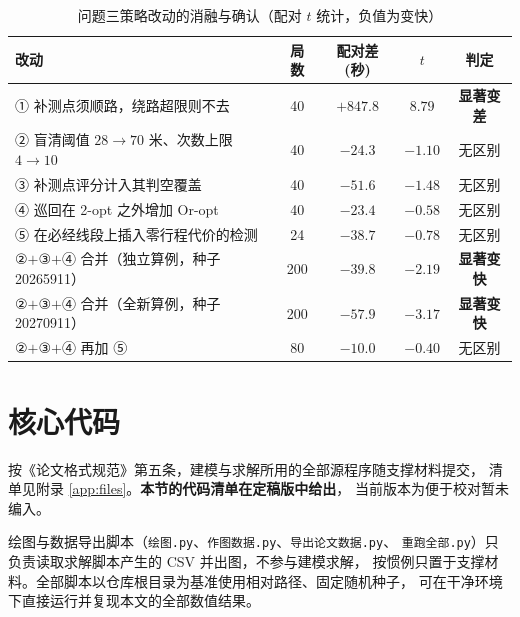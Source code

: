 \documentclass[withoutpreface, bwprint]{cumcmthesis}
\begin{document}
\begin{appendices}
\begin{table}[htbp]
  \centering
  \caption{问题三策略改动的消融与确认（配对 $t$ 统计，负值为变快）}
  \label{tab:p3opt}
  \begin{tabularx}{\textwidth}{Xcccc}
    \toprule
    改动 & 局数 & 配对差(秒) & $t$ & 判定 \\
    \midrule
    ① 补测点须顺路，绕路超限则不去 & 40 & $+847.8$ & $8.79$ & \textbf{显著变差} \\
    ② 盲清阈值 $28\to70$ 米、次数上限 $4\to10$ & 40 & $-24.3$ & $-1.10$ & 无区别 \\
    ③ 补测点评分计入其判空覆盖 & 40 & $-51.6$ & $-1.48$ & 无区别 \\
    ④ 巡回在 2-opt 之外增加 Or-opt & 40 & $-23.4$ & $-0.58$ & 无区别 \\
    ⑤ 在必经线段上插入零行程代价的检测 & 24 & $-38.7$ & $-0.78$ & 无区别 \\
    \midrule
    ②$+$③$+$④ 合并（独立算例，种子 20265911） & 200 & $-39.8$ & $-2.19$ & \textbf{显著变快} \\
    ②$+$③$+$④ 合并（全新算例，种子 20270911） & 200 & $-57.9$ & $-3.17$ & \textbf{显著变快} \\
    ②$+$③$+$④ 再加 ⑤ & 80 & $-10.0$ & $-0.40$ & 无区别 \\
    \bottomrule
  \end{tabularx}
\end{table}





\section{核心代码}


按《论文格式规范》第五条，建模与求解所用的全部源程序随支撑材料提交，
清单见附录 \ref{app:files}。\textbf{本节的代码清单在定稿版中给出}，
当前版本为便于校对暂未编入。

绘图与数据导出脚本（\texttt{绘图.py}、\texttt{作图数据.py}、\texttt{导出论文数据.py}、
\texttt{重跑全部.py}）只负责读取求解脚本产生的 CSV 并出图，不参与建模求解，
按惯例只置于支撑材料。全部脚本以仓库根目录为基准使用相对路径、固定随机种子，
可在干净环境下直接运行并复现本文的全部数值结果。


\end{appendices}
\end{document}
